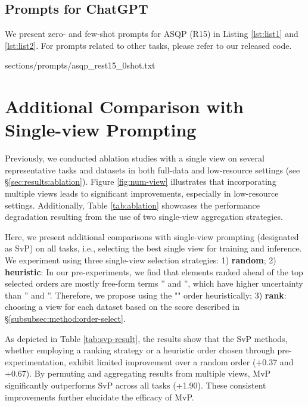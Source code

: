 \documentclass[11pt]{article}
\begin{document}
\subsection{Prompts for ChatGPT}
We present zero- and few-shot prompts for ASQP (R15) in Listing \ref{lst:list1} and \ref{lst:list2}. For prompts related to other tasks, please refer to our released code.

\begin{figure*}
    \centering
    
    {sections/prompts/asqp_rest15_0shot.txt}
\end{figure*}


\begin{figure*}
    \centering
    
\end{figure*}


\section{Additional Comparison with Single-view Prompting}
\label{sec:appendix:svp}

Previously, we conducted ablation studies with a single view on several representative tasks and datasets in both full-data and low-resource settings (see \S \ref{sec:results:ablation}). Figure \ref{fig:num-view} illustrates that incorporating multiple views leads to significant improvements, especially in low-resource settings. Additionally, Table \ref{tab:ablation} showcases the performance degradation resulting from the use of two single-view aggregation strategies.

Here, we present additional comparisons with single-view prompting (designated as SvP) on all tasks, i.e., selecting the best single view for training and inference. We experiment using three single-view selection strategies:
1) \textbf{random};
2) \textbf{heuristic}: In our pre-experiments, we find that elements ranked ahead of the top selected orders are mostly free-form terms '' and '', which have higher uncertainty than '' and ''. Therefore, we propose using the "" order heuristically;
3) \textbf{rank}: choosing a view for each dataset based on the score described in \S \ref{subsubsec:method:order-select}.

As depicted in Table \ref{tab:svp-result}, the results show that the SvP methods, whether employing a ranking strategy or a heuristic order chosen through pre-experimentation, exhibit limited improvement over a random order (+0.37 and +0.67). By permuting and aggregating results from multiple views, MvP significantly outperforms SvP across all tasks (+1.90). These consistent improvements further elucidate the efficacy of MvP.
\end{document}
